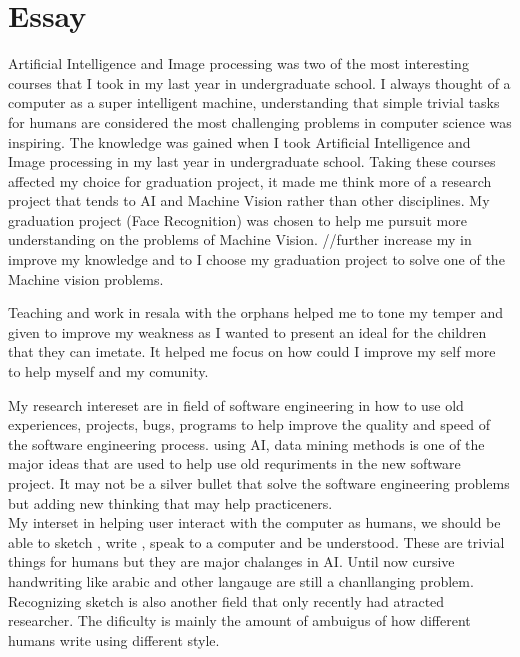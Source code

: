 \documentclass[a4paper,12pt]{article}%
\begin{document}
	  \hrulefill
	  
	  \hrulefill
	  
	 	  \hrulefill
	 	  
	  \hrulefill
	  
	  \hrulefill
	  
\section{Essay}
Artificial Intelligence and Image processing was two of the most interesting courses that I took in my last year in undergraduate school. 
I always thought of a computer as a super intelligent machine, understanding that simple trivial tasks for humans are considered the most challenging problems in computer science was inspiring. The knowledge was gained when I took Artificial Intelligence and Image processing in my last year in undergraduate school. Taking these courses affected my choice for graduation project, it made me think more of a research project that tends to AI and Machine Vision rather than other disciplines. My graduation project (Face Recognition) was chosen to help me pursuit more understanding on the problems of Machine Vision. 
//further increase my  in  improve my knowledge and  to I choose my graduation project  to solve one of the Machine vision problems. 


 Teaching and work in resala with the orphans helped me to tone my temper and given to improve my weakness as I wanted to present an ideal for the children that they can imetate. It helped me focus on how could I improve my self more to help myself and my comunity. 
 
 
 My research intereset are in field of software engineering in how to use old experiences, projects, bugs, programs to help improve the quality and speed of the software engineering process. using AI, data mining methods is one of the major ideas that are used to help use old requriments in the new software project.  It may not be a silver bullet that solve the software engineering problems but adding new thinking that may help practiceners.  \\
 My interset in helping user interact with the computer as humans, we should be able to sketch , write , speak to a computer and be understood. These are trivial things for humans but they are major chalanges in AI. Until now cursive handwriting like arabic and other langauge are still a chanllanging problem. Recognizing sketch is also another field that only recently had atracted researcher. The dificulty is mainly the amount of ambuigus of how different humans write using different style. 
 
\end{document}
